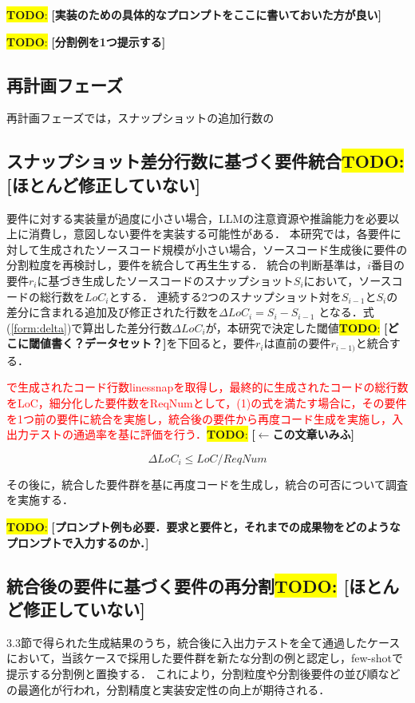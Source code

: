 \documentclass[submit,techrep,noauthor]{ipsj}
\newcommand{\todo}[1]{\colorbox{yellow}{{\bf TODO}:}{\color{red} {\textbf{[#1]}}}}
\begin{document}
\todo{実装のための具体的なプロンプトをここに書いておいた方が良い}

\todo{分割例を1つ提示する}

\subsection{再計画フェーズ}
再計画フェーズでは，スナップショットの追加行数の


\subsection{スナップショット差分行数に基づく要件統合\todo{ほとんど修正していない}}

要件に対する実装量が過度に小さい場合，LLMの注意資源や推論能力を必要以上に消費し，意図しない要件を実装する可能性がある．
本研究では，各要件に対して生成されたソースコード規模が小さい場合，ソースコード生成後に要件の分割粒度を再検討し，要件を統合して再生生する．
統合の判断基準は，$i$番目の要件$r_i$に基づき生成したソースコードのスナップショット$S_i$において，ソースコードの総行数を$LoC_i$とする．
連続する2つのスナップショット対を$S_{i-1}$と$S_i$の差分に含まれる追加及び修正された行数を$\Delta LoC_i = S_i - S_{i-1}$ となる．式(\ref{form:delta})で算出した差分行数$\Delta LoC_i$が，本研究で決定した閾値\todo{どこに閾値書く？データセット？}を下回ると，要件$r_i$は直前の要件$r_{i-1)}$と統合する．

\textcolor{red}{で生成されたコード行数linessnapを取得し，最終的に生成されたコードの総行数をLoC，細分化した要件数をReqNumとして，(1)の式を満たす場合に，その要件を1つ前の要件に統合を実施し，統合後の要件から再度コード生成を実施し，入出力テストの通過率を基に評価を行う．}\todo{$\leftarrow$この文章いみふ}

\begin{equation}\label{form:delta}
    \Delta LoC_i \leq LoC / ReqNum
\end{equation}

その後に，統合した要件群を基に再度コードを生成し，統合の可否について調査を実施する．

\todo{プロンプト例も必要．要求と要件と，それまでの成果物をどのようなプロンプトで入力するのか．}


\subsection{統合後の要件に基づく要件の再分割\todo{ほとんど修正していない}}
3.3節で得られた生成結果のうち，統合後に入出力テストを全て通過したケースにおいて，当該ケースで採用した要件群を新たな分割の例と認定し，few-shotで提示する分割例と置換する．
これにより，分割粒度や分割後要件の並び順などの最適化が行われ，分割精度と実装安定性の向上が期待される．
\end{document}

